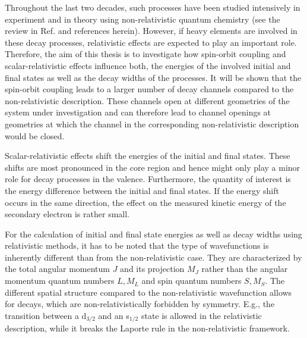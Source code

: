 Throughout the last two decades, such processes have been studied intensively
in experiment 
and in theory using non-relativistic quantum chemistry
(see the review in Ref. \cite{Hergenhahn11} and references herein).
However, if heavy elements are involved in these decay processes, relativistic
effects are expected to play an important role.
Therefore, the aim of this
thesis is to investigate how spin-orbit coupling and scalar-relativistic
effects influence both, the energies of the involved initial and final states
as well as the decay widths of the processes.
It will be shown that the spin-orbit coupling leads to a larger number
of decay channels compared to the non-relativistic description. These channels
open at different geometries of the system under investigation and
can therefore lead to channel openings at geometries at which the channel
in the corresponding non-relativistic description would be closed.

Scalar-relativistic effects shift the energies of the initial and final states.
These shifts are most pronounced in the core region and hence might only play
a minor role for decay processes in the valence. Furthermore, the
quantity of interest is the energy difference between the initial and final
states. If the
energy shift occurs in the same direction, the effect on the measured kinetic
energy of the secondary electron is rather small.

For the calculation of initial and final state energies as well as decay widths
using relativistic methods, it has to be noted that the type of
wavefunctions is inherently different than from the non-relativistic case. They
are characterized by the total angular momentum $J$ and its projection $M_J$ rather
than the angular momentum quantum numbers $L,M_L$ and spin quantum numbers
$S,M_S$. The different spatial structure compared to the non-relativistic
wavefunction allows
for decays, which are non-relativistically forbidden by symmetry. E.g., the
transition between a d$_{3/2}$ and an s$_{1/2}$ state is allowed in the
relativistic description, while it breaks the Laporte rule in the non-relativistic
framework.

